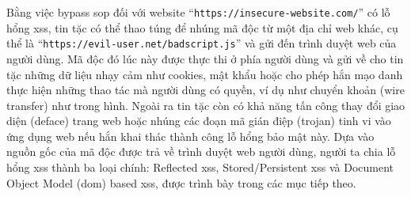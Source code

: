Bằng việc bypass \acrshort{sop} đối với website ``\texttt{https://insecure-website.com/}'' có lỗ hổng \acrshort{xss}, tin tặc có thể thao túng để nhúng mã độc từ một địa chỉ web khác, cụ thể là ``\texttt{https://evil-user.net/badscript.js}'' và gửi đến trình duyệt web của người dùng. Mã độc đó lúc này được thực thi ở phía người dùng và gửi về cho tin tặc những dữ liệu nhạy cảm như cookies, mật khẩu hoặc cho phép hắn mạo danh thực hiện những thao tác mà người dùng có quyền, ví dụ như chuyển khoản (wire transfer) như trong hình. Ngoài ra tin tặc còn có khả năng tấn công thay đổi giao diện (deface) trang web hoặc nhúng các đoạn mã gián điệp (trojan) tinh vi vào ứng dụng web nếu hắn khai thác thành công lỗ hổng bảo mật này. Dựa vào nguồn gốc của mã độc được trả về trình duyệt web người dùng, người ta chia lỗ hổng \acrshort{xss} thành ba loại chính: Reflected \acrshort{xss}, Stored/Persistent \acrshort{xss} và Document Object Model (\acrshort{dom}) based \acrshort{xss}, được trình bày trong các mục tiếp theo.

